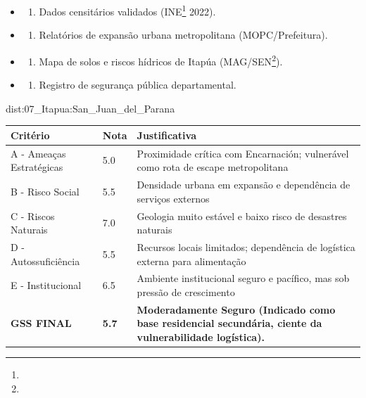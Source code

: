 {\begin{itemize}
\tightlist
\item
  \begin{enumerate}
  \def\labelenumi{\arabic{enumi})}
  \tightlist
  \item
    Dados censitários validados (INE\footnote{\fineINE} 2022).
  \end{enumerate}
\item
  \begin{enumerate}
  \def\labelenumi{\arabic{enumi})}
  \setcounter{enumi}{1}
  \tightlist
  \item
    Relatórios de expansão urbana metropolitana (MOPC/\allowbreak Prefeitura).
  \end{enumerate}
\item
  \begin{enumerate}
  \def\labelenumi{\arabic{enumi})}
  \setcounter{enumi}{2}
  \tightlist
  \item
    Mapa de solos e riscos hídricos de Itapúa (MAG/\allowbreak SEN\footnote{\fineSEN}).
  \end{enumerate}
\item
  \begin{enumerate}
  \def\labelenumi{\arabic{enumi})}
  \setcounter{enumi}{3}
  \tightlist
  \item
    Registro de segurança pública departamental.
  \end{enumerate}
\end{itemize}}{dist:07_Itapua:San_Juan_del_Parana}
\begin{table}[ht!]
\small \begin{tabular}{p{3.0cm}p{0.8cm}p{6.0cm}} \toprule
\textbf{Critério} & \textbf{Nota} & \textbf{Justificativa} \\ \midrule
A - Ameaças Estratégicas & 5.0 & Proximidade crítica com Encarnación; vulnerável como rota de escape metropolitana \\
B - Risco Social & 5.5 & Densidade urbana em expansão e dependência de serviços externos \\
C - Riscos Naturais & 7.0 & Geologia muito estável e baixo risco de desastres naturais \\
D - Autossuficiência & 5.5 & Recursos locais limitados; dependência de logística externa para alimentação \\
E - Institucional & 6.5 & Ambiente institucional seguro e pacífico, mas sob pressão de crescimento \\
\midrule \textbf{GSS FINAL} & \textbf{5.7} & \textbf{Moderadamente Seguro (Indicado como base residencial secundária, ciente da vulnerabilidade logística).} \\ \bottomrule \end{tabular}
\end{table}

